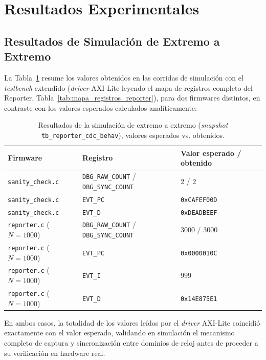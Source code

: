 
\section{Resultados Experimentales}
\label{sec:resultados}

\subsection{Resultados de Simulación de Extremo a Extremo}
\label{ssec:resultados_simulacion}

La Tabla~\ref{tab:resultados_sim} resume los valores obtenidos en las
corridas de simulación con el \textit{testbench} extendido (\textit{driver}
AXI-Lite leyendo el mapa de registros completo del Reporter,
Tabla~\ref{tab:mapa_registros_reporter}), para dos firmwares distintos, en
contraste con los valores esperados calculados analíticamente:

\begin{table}[htbp]
\centering
\caption{Resultados de la simulación de extremo a extremo (\textit{snapshot} \texttt{tb\_reporter\_cdc\_behav}), valores esperados vs. obtenidos.}
\label{tab:resultados_sim}
\begin{tabular}{lll}
\hline
\textbf{Firmware} & \textbf{Registro} & \textbf{Valor esperado / obtenido} \\ \hline
\texttt{sanity\_check.c} & \texttt{DBG\_RAW\_COUNT} / \texttt{DBG\_SYNC\_COUNT} & $2$ / $2$ \\
\texttt{sanity\_check.c} & \texttt{EVT\_PC} & \texttt{0xCAFEF00D} \\
\texttt{sanity\_check.c} & \texttt{EVT\_D} & \texttt{0xDEADBEEF} \\
\texttt{reporter.c} ($N=1000$) & \texttt{DBG\_RAW\_COUNT} / \texttt{DBG\_SYNC\_COUNT} & $3000$ / $3000$ \\
\texttt{reporter.c} ($N=1000$) & \texttt{EVT\_PC} & \texttt{0x0000010C} \\
\texttt{reporter.c} ($N=1000$) & \texttt{EVT\_I} & $999$ \\
\texttt{reporter.c} ($N=1000$) & \texttt{EVT\_D} & \texttt{0x14E875E1} \\ \hline
\end{tabular}
\end{table}

En ambos casos, la totalidad de los valores leídos por el \textit{driver}
AXI-Lite coincidió exactamente con el valor esperado, validando en
simulación el mecanismo completo de captura y sincronización entre
dominios de reloj antes de proceder a su verificación en hardware real.

